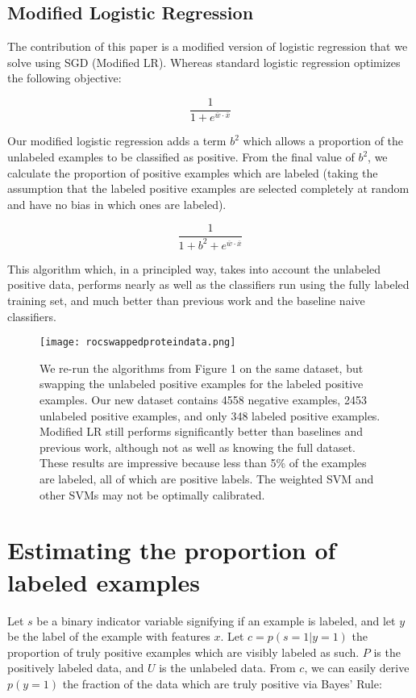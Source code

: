 \documentclass[]{article}
\begin{document}
\subsection{Modified Logistic Regression}
The contribution of this paper is a modified version of logistic regression that we solve using SGD (Modified LR).  Whereas standard logistic regression optimizes the following objective:

$$ \frac{1}{1 + e^{\overline{w} \cdot \overline{x}}} $$

Our modified logistic regression adds a term $b^2$ which allows a proportion of the unlabeled examples to be classified as positive. From the final value of $b^2$, we calculate the proportion of positive examples which are labeled (taking the assumption that the labeled positive examples are selected completely at random and have no bias in which ones are labeled).

$$ \frac{1}{1 + b^2 + e^{\overline{w} \cdot \overline{x}}} $$

This algorithm which, in a principled way, takes into account the unlabeled positive data, performs nearly as well as the classifiers run using the fully labeled training set, and much better than previous work and the baseline naive classifiers.


\label{ROC for Swapped Protein Dataset}
\begin{figure}[ht!]
\centering
\texttt{[image: rocswappedproteindata.png]}
\caption{We re-run the algorithms from Figure 1 on the same dataset, but swapping the unlabeled positive examples for the labeled positive examples. Our new dataset contains 4558 negative examples, 2453 unlabeled positive examples, and only 348 labeled positive examples.  Modified LR still performs significantly better than baselines and previous work, although not as well as knowing the full dataset.  These results are impressive because less than 5\% of the examples are labeled, all of which are positive labels. The weighted SVM and other SVMs may not be optimally calibrated.}
\end{figure}


\section{Estimating the proportion of labeled examples}
Let $s$ be a binary indicator variable signifying if an example is labeled, and let $y$ be the label of the example with features $x$. Let $c = p(s=1|y=1)$ the proportion of truly positive examples which are visibly labeled as such. $P$ is the positively labeled data, and $U$ is the unlabeled data. From $c$, we can easily derive $p(y=1)$ the fraction of the data which are truly positive via Bayes' Rule:
\end{document}
